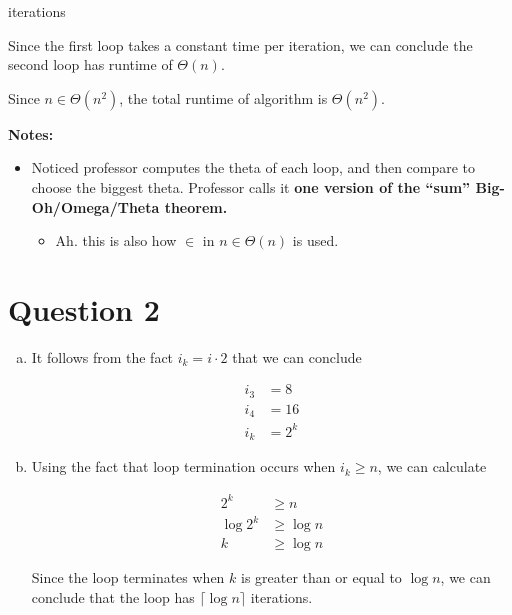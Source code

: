 \documentclass[12pt]{article}
\begin{document}
\begin{enumerate}[a.]
\begin{mdframed}
        iterations

        \bigskip

        \color{red}
        Since the first loop takes a constant time per iteration, we can conclude
        the second loop has runtime of $\Theta(n)$.
        \color{black}

        \bigskip

        \color{red}
        Since $n \in \Theta(n^2)$, the total runtime of algorithm is $\Theta(n^2)$.
        \color{black}

    \end{mdframed}

    \bigskip

    \textbf{Notes:}

    \begin{itemize}
        \item Noticed professor computes the theta of each loop, and then compare
        to choose the biggest theta. Professor calls it \textbf{one version of
        the “sum” Big-Oh/Omega/Theta theorem.}

        \begin{itemize}
            \item Ah. this is also how $\in$ in $n \in \Theta(n)$ is used.
        \end{itemize}

    \end{itemize}

\end{enumerate}

\section*{Question 2}
\begin{enumerate}[a.]
    \item

    It follows from the fact $i_k = i \cdot 2$ that we can conclude

    \begin{align*}
    i_3 &= 8\\
    i_4 &= 16\\
    i_k &= 2^k
    \end{align*}

    \item

    Using the fact that loop termination occurs when $i_k \geq n$, we can
    calculate

    \setcounter{equation}{0}
    \begin{align}
        2^k &\geq n\\
        \log 2^k &\geq \log n\\
        k &\geq \log n
    \end{align}

    \bigskip

    Since the loop terminates when $k$ is greater than or equal to $\log n$, we
    can conclude that the loop has $\lceil \log n \rceil$ iterations.

\end{enumerate}
\end{document}

